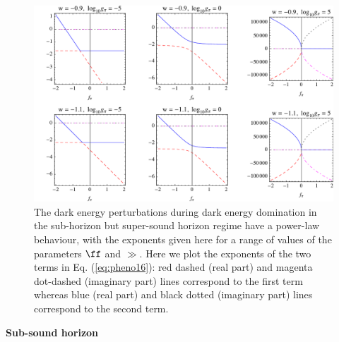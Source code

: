 \begin{figure}[tb]
\centering
\includegraphics[width=.9\textwidth]{figures/chapter-ade/expogrid3.pdf}
\caption{The dark energy perturbations during dark energy domination in the sub-horizon but super-sound horizon regime have a power-law behaviour,
with the exponents given here for a range of values of the parameters $\ff$ and $\gg$. Here we plot the exponents of the two terms in Eq. (\ref{eq:pheno16}): red dashed (real part) and magenta dot-dashed (imaginary part) lines correspond to the first term whereas blue (real part) and black dotted (imaginary part) lines correspond to the second term.}
\label{fig:expogrid3}
\end{figure}

\noindent\textbf{Sub-sound horizon}\\


